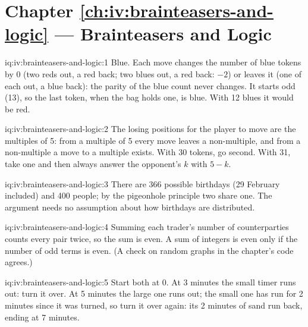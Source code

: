 \section*{Chapter \ref{ch:iv:brainteasers-and-logic} --- Brainteasers and Logic}

\begin{solution}{iq:iv:brainteasers-and-logic:1}
Blue. Each move changes the number of blue tokens by 0 (two reds out, a red back; two blues out, a red back:
$-2$) or leaves it (one of each out, a blue back): the parity of the blue count never changes. It starts odd
(13), so the last token, when the bag holds one, is blue. With 12 blues it would be red.
\end{solution}

\begin{solution}{iq:iv:brainteasers-and-logic:2}
The losing positions for the player to move are the multiples of 5: from a multiple of 5 every move leaves a
non-multiple, and from a non-multiple a move to a multiple exists. With 30 tokens, go second. With 31, take one
and then always answer the opponent's $k$ with $5 - k$.
\end{solution}

\begin{solution}{iq:iv:brainteasers-and-logic:3}
There are 366 possible birthdays (29 February included) and 400 people; by the pigeonhole principle two share
one. The argument needs no assumption about how birthdays are distributed.
\end{solution}

\begin{solution}{iq:iv:brainteasers-and-logic:4}
Summing each trader's number of counterparties counts every pair twice, so the sum is even. A sum of integers is
even only if the number of odd terms is even. (A check on random graphs in the chapter's code agrees.)
\end{solution}

\begin{solution}{iq:iv:brainteasers-and-logic:5}
Start both at 0. At 3 minutes the small timer runs out: turn it over. At 5 minutes the large one runs out; the
small one has run for 2 minutes since it was turned, so turn it over again: its 2 minutes of sand run back, ending
at 7 minutes.
\end{solution}

